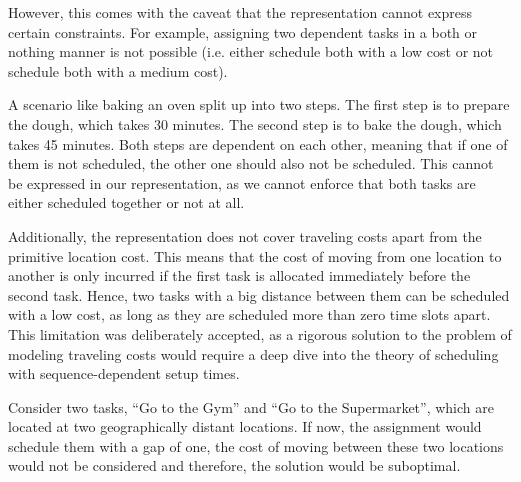However, this comes with the caveat that the representation cannot express certain constraints. For example, assigning two dependent tasks in a both or nothing manner is not possible (i.e. either schedule both with a low cost or not schedule both with a medium cost).
\begin{example}
    A scenario like baking an oven split up into two steps. The first step is to prepare the dough, which takes 30 minutes. The second step is to bake the dough, which takes 45 minutes. Both steps are dependent on each other, meaning that if one of them is not scheduled, the other one should also not be scheduled. This cannot be expressed in our representation, as we cannot enforce that both tasks are either scheduled together or not at all.
\end{example}
Additionally, the representation does not cover traveling costs apart from the primitive location cost. This means that the cost of moving from one location to another is only incurred if the first task is allocated immediately before the second task. Hence, two tasks with a big distance between them can be scheduled with a low cost, as long as they are scheduled more than zero time slots apart. This limitation was deliberately accepted, as a rigorous solution to the problem of modeling traveling costs would require a deep dive into the theory of scheduling with sequence-dependent setup times.
\begin{example}
    Consider two tasks, ``Go to the Gym'' and ``Go to the Supermarket'', which are located at two geographically distant locations. If now, the assignment would schedule them with a gap of one, the cost of moving between these two locations would not be considered and therefore, the solution would be suboptimal.
\end{example}

